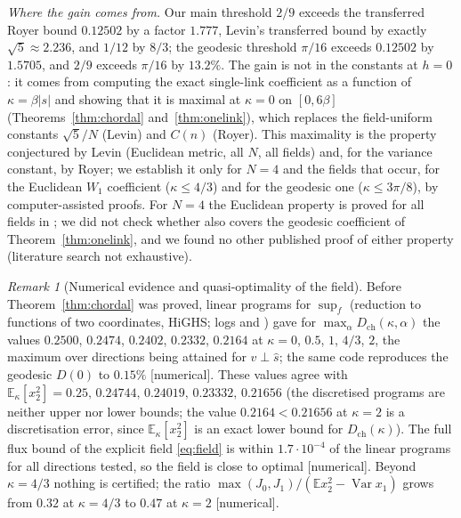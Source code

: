 \documentclass[11pt,a4paper]{article}
\theoremstyle{remark}
\newtheorem{remark}[theorem]{Remark}
\theoremstyle{definition}
\newcommand{\E}{\mathbb{E}}
\newcommand{\Var}{\operatorname{Var}}
\newcommand{\st}[1]{\textsf{[#1]}}
\newcommand{\Dch}{D_{\mathrm{ch}}}
\begin{document}
\emph{Where the gain comes from.} Our main threshold $2/9$ exceeds the transferred Royer bound $0.12502$ by a
factor $1.777$, Levin's transferred bound by exactly $\sqrt5\approx2.236$, and $1/12$ by $8/3$; the geodesic
threshold $\pi/16$ exceeds $0.12502$ by $1.5705$, and $2/9$ exceeds $\pi/16$ by $13.2\%$. The gain is not in the
constants at $h=0$: it comes from computing the exact single-link coefficient as a function of $\kappa=\beta|s|$ and
showing that it is maximal at $\kappa=0$ on $[0,6\beta]$ (Theorems~\ref{thm:chordal} and~\ref{thm:onelink}), which
replaces the field-uniform constants $\sqrt5/N$ (Levin) and $C(n)$ (Royer). This maximality is the property
conjectured by Levin (Euclidean metric, all $N$, all fields) and, for the variance constant, by Royer; we establish
it only for $N=4$ and the fields that occur, for the Euclidean $W_1$ coefficient ($\kappa\le4/3$) and for the
geodesic one ($\kappa\le3\pi/8$), by computer-assisted proofs. For $N=4$ the Euclidean property is proved for all
fields in \cite[Theorem~7]{BB26}; we did not check whether \cite{BB26} also covers the geodesic coefficient of
Theorem~\ref{thm:onelink}, and we found no other published proof of either property (literature search not
exhaustive).

\begin{remark}[Numerical evidence and quasi-optimality of the field]\label{rem:chordal}
Before Theorem~\ref{thm:chordal} was proved, linear programs for $\sup_f$ (reduction to functions of two
coordinates, HiGHS; logs  and ) gave for
$\max_\alpha\Dch(\kappa,\alpha)$ the values $0.2500$, $0.2474$, $0.2402$, $0.2332$, $0.2164$ at $\kappa=0$, $0.5$, $1$,
$4/3$, $2$,
the maximum over directions being attained for $v\perp\hat s$; the same code reproduces the geodesic $D(0)$ to
$0.15\%$ \st{numerical}. These values agree with $\E_\kappa[x_2^2]=0.25,\,0.24744,\,0.24019,\,0.23332,\,0.21656$ (the
discretised programs are neither upper nor lower bounds; the value $0.2164<0.21656$ at $\kappa=2$ is a
discretisation error, since $\E_\kappa[x_2^2]$ is an exact lower bound for $\Dch(\kappa)$). The full flux bound of
the explicit field \eqref{eq:field} is within $1.7\cdot10^{-4}$ of the linear programs for all directions tested,
so the field is close to optimal \st{numerical}. Beyond $\kappa=4/3$ nothing is certified; the ratio
$\max(J_0,J_1)/(\E x_2^2-\Var x_1)$ grows from $0.32$ at $\kappa=4/3$ to $0.47$ at $\kappa=2$ \st{numerical}.
\end{remark}
\end{document}
